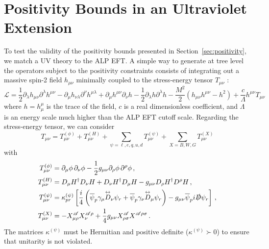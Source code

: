 \section{Positivity Bounds in an Ultraviolet Extension\label{app:UVext}}

To test the validity of the positivity bounds presented in Section~\ref{sec:positivity}, we match a UV theory to the ALP EFT.
A simple way to generate at tree level the operators subject to the positivity constraints consists of integrating out a massive spin-2 field $h_{\mu\nu}$ minimally coupled to the stress-energy tensor $T_{\mu\nu}$ \cite{Fierz:1939ix,Hinterbichler:2011tt}:
\begin{equation}
    \mathcal L = \frac{1}{2}\partial_\lambda h_{\mu\nu}\partial^\lambda h^{\mu\nu}-\partial_\mu h_{\nu\lambda}\partial^\nu h^{\mu\lambda} +\partial_\mu h^{\mu\nu}\partial_\nu h-\frac{1}{2}\partial_\lambda h  \partial^\lambda h-\frac{M^2}{2}(h_{\mu\nu}h^{\mu\nu}-h^2)
    +\frac{c}{\Lambda}h^{\mu\nu}T_{\mu\nu}
\end{equation}
where $h=h^\mu_\mu$ is the trace of the field, $c$ is a real dimensionless coefficient, and $\Lambda$ is an energy scale much higher than the ALP EFT cutoff scale. Regarding the stress-energy tensor, we can consider
\begin{equation}
    T_{\mu\nu} = T_{\mu\nu}^{(\phi)} + T_{\mu\nu}^{(H)} + \sum_{\psi = \ell, e , q, u, d} T_{\mu\nu}^{(\psi)} + \sum_{X=B,W,G} T_{\mu\nu}^{(X)}
\end{equation}
with
\begin{align}
    T_{\mu\nu}^{(\phi)} &= \partial_\mu \phi \, \partial_\nu \phi - \frac{1}{2}g_{\mu\nu}\partial_\rho \phi \, \partial^\rho \phi\,,\label{eq:set_phi}\\
    T_{\mu\nu}^{(H)} &= D_\mu H^\dagger D_\nu H + D_\nu H^\dagger D_\mu H - g_{\mu\nu}D_\rho H^\dagger D^\rho H\,,\label{eq:set_higgs}\\
    T^{(\psi)}_{\mu\nu} &= \kappa^{(\psi)}_{pr}\left[\frac{i}{4}\left( \overline \psi_p \gamma_\mu \overset{\leftrightarrow}{D}_\nu \psi_r+\overline \psi_p \gamma_\nu \overset{\leftrightarrow}{D}_\mu \psi_r\right) -  g_{\mu\nu} \overline \psi_p i\slashed{D} \psi_r\right]\,,\\
    T^{(X)}_{\mu\nu} &= -X^{\mathscr A}_{\mu\rho} X_\nu^{\mathscr A \rho} + \frac{1}{4}g_{\mu\nu} X^{\mathscr A}_{\rho\sigma}X^{\mathscr A \rho\sigma}\,.
\end{align}
The matrices $\kappa^{(\psi)}$ must be Hermitian and positive definite ($\kappa^{(\psi)} \succ 0$) to ensure that unitarity is not violated.

